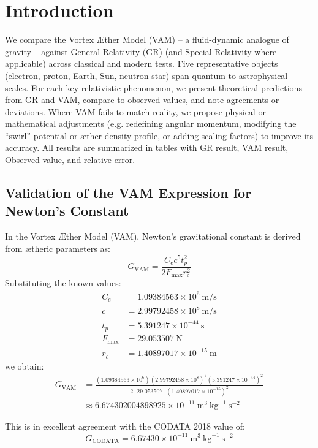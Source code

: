 
\section*{Introduction}
We compare the Vortex Æther Model (VAM) – a fluid-dynamic analogue of gravity – against General Relativity (GR) (and Special Relativity where applicable) across classical and modern tests. Five representative objects (electron, proton, Earth, Sun, neutron star) span quantum to astrophysical scales. For each key relativistic phenomenon, we present theoretical predictions from GR and VAM, compare to observed values, and note agreements or deviations. Where VAM fails to match reality, we propose physical or mathematical adjustments (e.g. redefining angular momentum, modifying the “swirl” potential or æther density profile, or adding scaling factors) to improve its accuracy. All results are summarized in tables with GR result, VAM result, Observed value, and relative error.

\subsection*{Validation of the VAM Expression for Newton's Constant}

In the Vortex Æther Model (VAM), Newton's gravitational constant is derived from ætheric parameters as:
\begin{equation}
G_\text{VAM} = \frac{C_e c^5 t_p^2}{2 F_{\max} r_c^2}
\end{equation}
Substituting the known values:
\begin{align*}
C_e &= 1.09384563 \times 10^6 \ \text{m/s} \\
c &= 2.99792458 \times 10^8 \ \text{m/s} \\
t_p &= 5.391247 \times 10^{-44} \ \text{s} \\
F_{\max} &= 29.053507 \ \text{N} \\
r_c &= 1.40897017 \times 10^{-15} \ \text{m}
\end{align*}
we obtain:
\begin{align*}
G_\text{VAM} &= \frac{(1.09384563 \times 10^6)(2.99792458 \times 10^8)^5 (5.391247 \times 10^{-44})^2}{2 \cdot 29.053507 \cdot (1.40897017 \times 10^{-15})^2} \\
&\approx 6.674302004898925 \times 10^{-11} \ \text{m}^3 \ \text{kg}^{-1} \ \text{s}^{-2}
\end{align*}

This is in excellent agreement with the CODATA 2018 value of:
\[
G_\text{CODATA} = 6.67430 \times 10^{-11} \ \text{m}^3 \ \text{kg}^{-1} \ \text{s}^{-2}
\]

